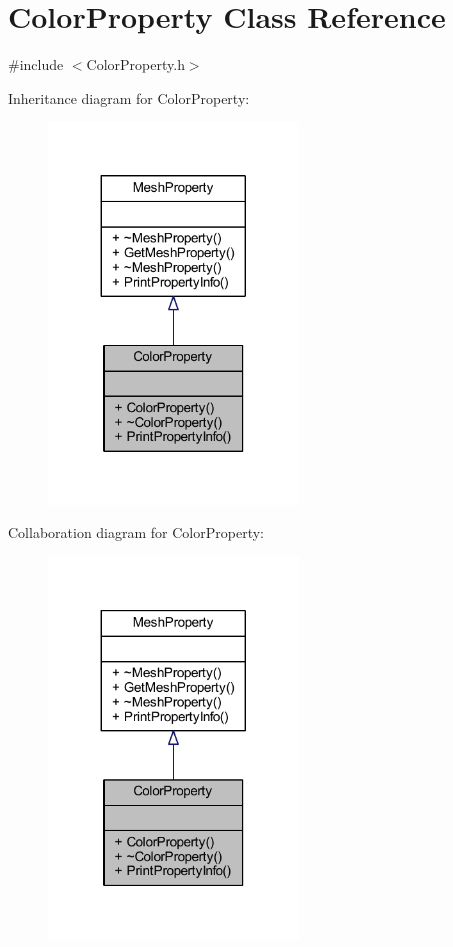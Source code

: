 \hypertarget{class_color_property}{}\section{Color\+Property Class Reference}
\label{class_color_property}


{\ttfamily \#include $<$Color\+Property.\+h$>$}



Inheritance diagram for Color\+Property\+:\nopagebreak
\begin{figure}[H]
\begin{center}
\leavevmode
\includegraphics[width=188pt]{class_color_property__inherit__graph}
\end{center}
\end{figure}


Collaboration diagram for Color\+Property\+:\nopagebreak
\begin{figure}[H]
\begin{center}
\leavevmode
\includegraphics[width=188pt]{class_color_property__coll__graph}
\end{center}
\end{figure}
